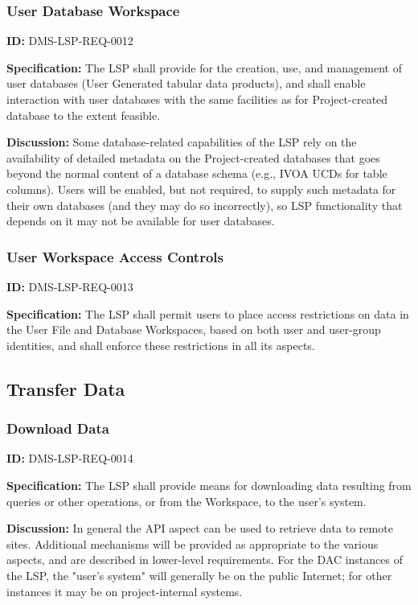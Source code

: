 \documentclass[SE,toc,lsstdraft]{lsstdoc}
\begin{document}
\subsubsection{User Database Workspace}

\label{DMS-LSP-REQ-0012}
\textbf{ID:} DMS-LSP-REQ-0012

\textbf{Specification:}
The LSP shall provide for the creation, use, and management of user databases (User Generated tabular data products), and shall enable interaction with user databases with the same facilities as for Project-created database to the extent feasible.

\textbf{Discussion:}
Some database-related capabilities of the LSP rely on the availability of detailed metadata on the Project-created databases that goes beyond the normal content of a database schema (e.g., IVOA UCDs for table columns).  Users will be enabled, but not required, to supply such metadata for their own databases (and they may do so incorrectly), so LSP functionality that depends on it may not be available for user databases.

\subsubsection{User Workspace Access Controls}

\label{DMS-LSP-REQ-0013}
\textbf{ID:} DMS-LSP-REQ-0013

\textbf{Specification:}
The LSP shall permit users to place access restrictions on data in the User File and Database Workspaces, based on both user and user-group identities, and shall enforce these restrictions in all its aspects.

\subsection{Transfer Data}

\subsubsection{Download Data}

\label{DMS-LSP-REQ-0014}
\textbf{ID:} DMS-LSP-REQ-0014

\textbf{Specification:}
The LSP shall provide means for downloading data resulting from queries or other operations, or from the Workspace, to the user's system.

\textbf{Discussion:}
In general the API aspect can be used to retrieve data to remote sites.  Additional mechanisms will be provided as appropriate to the various aspects, and are described in lower-level requirements.  For the DAC instances of the LSP, the "user's system" will generally be on the public Internet; for other instances it may be on project-internal systems.
\end{document}
